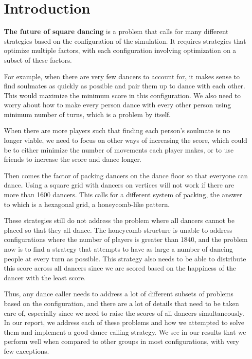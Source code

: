 \documentclass[a4paper,11pt,titlepage]{article}
\begin{document}
\section{Introduction}

\textbf{The future of square dancing} is a problem that calls for many different strategies based on the configuration of the simulation. It requires strategies that optimize multiple factors, with each configuration involving optimization on a subset of these factors. 

For example, when there are very few dancers to account for, it makes sense to find soulmates as quickly as possible and pair them up to dance with each other. This would maximize the minimum score in this configuration. We also need to worry about how to make every person dance with every other person using minimum number of turns, which is a problem by itself.

When there are more players such that finding each person's soulmate is no longer viable, we need to focus on other ways of increasing the score, which could be to either minimize the number of movements each player makes, or to use friends to increase the score and dance longer.

Then comes the factor of packing dancers on the dance floor so that everyone can dance. Using a square grid with dancers on vertices will not work if there are more than 1600 dancers. This calls for a different system of packing, the answer to which is a hexagonal grid, a honeycomb-like pattern.

These strategies still do not address the problem where all dancers cannot be placed so that they all dance. The honeycomb structure is unable to address configurations where the number of players is greater than 1840, and the problem now is to find a strategy that attempts to have as large a number of dancing people at every turn as possible. This strategy also needs to be able to distribute this score across all dancers since we are scored based on the happiness of the dancer with the least score.

Thus, any dance caller needs to address a lot of different subsets of problems based on the configuration, and there are a lot of details that need to be taken care of, especially since we need to raise the scores of all dancers simultaneously. In our report, we address each of these problems and how we attempted to solve them and implement a good dance calling strategy. We see in our results that we perform well when compared to other groups in most configurations, with very few exceptions.
\end{document}
